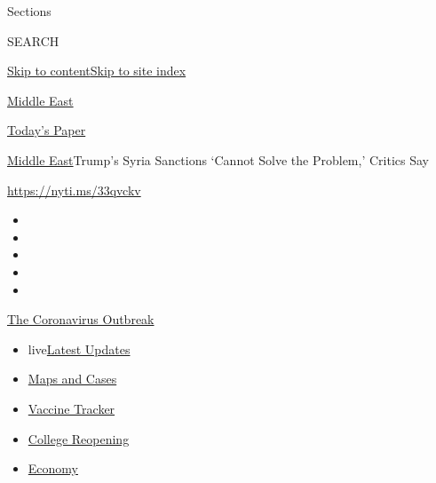 Sections

SEARCH

\protect\hyperlink{site-content}{Skip to
content}\protect\hyperlink{site-index}{Skip to site index}

\href{https://www.nytimes.com/section/world/middleeast}{Middle East}

\href{https://myaccount.nytimes.com/auth/login?response_type=cookie\&client_id=vi}{}

\href{https://www.nytimes.com/section/todayspaper}{Today's Paper}

\href{/section/world/middleeast}{Middle East}\textbar{}Trump's Syria
Sanctions `Cannot Solve the Problem,' Critics Say

\url{https://nyti.ms/33qvckv}

\begin{itemize}
\item
\item
\item
\item
\item
\end{itemize}

\href{https://www.nytimes.com/news-event/coronavirus?action=click\&pgtype=Article\&state=default\&region=TOP_BANNER\&context=storylines_menu}{The
Coronavirus Outbreak}

\begin{itemize}
\tightlist
\item
  live\href{https://www.nytimes.com/2020/08/04/world/coronavirus-cases.html?action=click\&pgtype=Article\&state=default\&region=TOP_BANNER\&context=storylines_menu}{Latest
  Updates}
\item
  \href{https://www.nytimes.com/interactive/2020/us/coronavirus-us-cases.html?action=click\&pgtype=Article\&state=default\&region=TOP_BANNER\&context=storylines_menu}{Maps
  and Cases}
\item
  \href{https://www.nytimes.com/interactive/2020/science/coronavirus-vaccine-tracker.html?action=click\&pgtype=Article\&state=default\&region=TOP_BANNER\&context=storylines_menu}{Vaccine
  Tracker}
\item
  \href{https://www.nytimes.com/2020/08/02/us/covid-college-reopening.html?action=click\&pgtype=Article\&state=default\&region=TOP_BANNER\&context=storylines_menu}{College
  Reopening}
\item
  \href{https://www.nytimes.com/live/2020/08/04/business/stock-market-today-coronavirus?action=click\&pgtype=Article\&state=default\&region=TOP_BANNER\&context=storylines_menu}{Economy}
\end{itemize}

